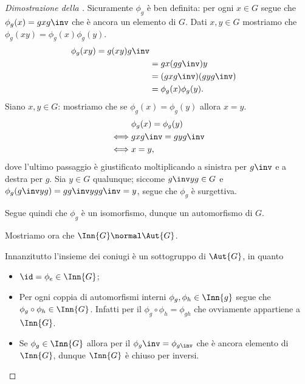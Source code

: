 \begin{proof}[Dimostrazione della ]
    Sicuramente $\phi_g$ è ben definita: per ogni $x \in G$ segue che $\phi_g(x) = gxg\inv$ che è ancora un elemento di $G$. 
     Dati $x, y \in G$ mostriamo che $\phi_g(xy) = \phi_g(x)\phi_g(y)$.
        \begin{align*}
            \phi_g(xy) = g(xy)g\inv \\
                &= gx(gg\inv)y \\
                &= (gxg\inv)(gyg\inv)\\
                &= \phi_g(x)\phi_g(y).
        \end{align*}
      Siano $x, y \in G$: mostriamo che se $\phi_g(x) = \phi_g(y)$ allora $x = y$. \begin{align*}
        &\phi_g(x) = \phi_g(y)\\
        \iff &gxg\inv = gyg\inv\\
        \iff &x = y,
    \end{align*}
    dove l'ultimo passaggio è giustificato moltiplicando a sinistra per $g\inv$ e a destra per $g$.
     Sia $y \in G$ qualunque; siccome $g\inv yg \in G$ e $\phi_g(g\inv y g) = gg\inv y gg\inv = y$, segue che $\phi_g$ è surgettiva.
    
    Segue quindi che $\phi_g$ è un isomorfismo, dunque un automorfismo di $G$.

    Mostriamo ora che $\Inn{G} \normal \Aut{G}$.
    
    Innanzitutto l'insieme dei coniugi è un sottogruppo di $\Aut{G}$, in quanto
    \begin{itemize}
        \item $\id = \phi_e \in \Inn{G}$;
        \item Per ogni coppia di automorfismi interni $\phi_g, \phi_h \in \Inn{g}$ segue che $\phi_g \circ \phi_h \in \Inn{G}$. Infatti per il  $\phi_g \circ \phi_h = \phi_{gh}$ che ovviamente appartiene a $\Inn{G}$.
        \item Se $\phi_g \in \Inn{G}$ allora per il  $\phi_{g}\inv = \phi_{g\inv}$ che è ancora elemento di $\Inn{G}$, dunque $\Inn{G}$ è chiuso per inversi.    
    \end{itemize}


\end{proof}
